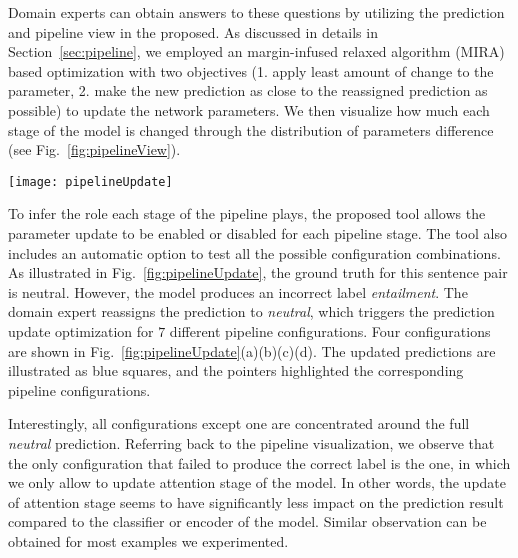 Domain experts can obtain answers to these questions by utilizing the prediction and pipeline view in the proposed. As discussed in details in Section~\ref{sec:pipeline}, we employed an margin-infused relaxed algorithm (MIRA) based optimization with two objectives (1. apply least amount of change to the parameter, 2. make the new prediction as close to the reassigned prediction as possible) to update the network parameters.
%
We then visualize how much each stage of the model is changed through the distribution of parameters difference (see Fig.~\ref{fig:pipelineView}).

\begin{figure*}[t]
\centering
\vspace{-2mm}
 \texttt{[image: pipelineUpdate]}
 \vspace{-2mm}
 \caption{
Experiment with all configurations for the label reassignment optimization. As shown in (d), the update of attention stage seems to have significantly less impact on the prediction result compared to the classifier or encoder of the model.
 }
\label{fig:pipelineUpdate}
\end{figure*}

To infer the role each stage of the pipeline plays, the proposed tool allows the parameter update to be enabled or disabled for each pipeline stage.
The tool also includes an automatic option to test all the possible configuration combinations. As illustrated in Fig.~\ref{fig:pipelineUpdate}, the ground truth for this sentence pair is neutral. However, the model produces an incorrect label \emph{entailment}. The domain expert reassigns the prediction to \emph{neutral}, which triggers the prediction update optimization for $7$ different pipeline configurations. Four configurations are shown in Fig.~\ref{fig:pipelineUpdate}(a)(b)(c)(d). The updated predictions are illustrated as blue squares, and the pointers highlighted the corresponding pipeline configurations.

Interestingly, all configurations except one are concentrated around the full \emph{neutral} prediction. Referring back to the pipeline visualization, we observe that the only configuration that failed to produce the correct label is the one, in which we only allow to update attention stage of the model.
%
In other words, the update of attention stage seems to have significantly less impact on the prediction result compared to the classifier or encoder of the model. Similar observation can be obtained for most examples we experimented.

